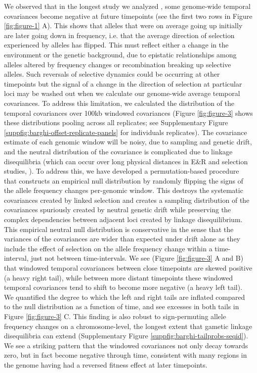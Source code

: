\documentclass[11pt]{article}
\begin{document}
We observed that in the longest study  we analyzed
\parencite{Barghi2019-qy}, some genome-wide temporal covariances become
negative at future timepoints (see the first two rows in Figure
\ref{fig:figure-1} A). This shows that alleles that were on average going up
initially are later going down in frequency, i.e. that the average direction of
selection experienced by alleles has flipped. This must reflect either a change
in the environment or the genetic background, due to epistatic relationships
among alleles altered by frequency changes or recombination breaking up
selective alleles.  Such reversals of selective dynamics could be occurring at
other timepoints but the signal of a change in the direction of selection at
particular loci may be washed out when we calculate our genome-wide average
temporal covariances. To address this limitation, we calculated the
distribution of the temporal covariances over 100kb windowed covariances
(Figure \ref{fig:figure-3} shows these distributions pooling across all
replicates; see Supplementary Figure
\ref{suppfig:barghi-offset-replicate-panels} for individuals replicates). The
covariance estimate of each genomic window will be noisy, due to sampling and
genetic drift, and the neutral distribution of the covariance is complicated
due to linkage disequilibria (which can occur over long physical distances in
E\&R and selection studies, \cite{Nuzhdin2013-gf,Baldwin-Brown2014-cl}). To
address this, we have developed a permutation-based procedure that constructs
an empirical null distribution by randomly flipping the signs of the allele
frequency changes per-genomic window. This destroys the systematic covariances
created by linked selection and creates a sampling distribution of the
covariances spuriously created by neutral genetic drift while preserving the
complex dependencies between adjacent loci created by linkage disequilibrium.
This empirical neutral null distribution is conservative in the sense that the
variances of the covariances are wider than expected under drift alone as they
include the effect of selection on the allele frequency change within a
time-interval, just not between time-intervals. We see (Figure
\ref{fig:figure-3} A and B) that windowed temporal covariances between close
timepoints are skewed positive (a heavy right tail), while between more distant
timepoints these windowed temporal covariances tend to shift to become more
negative (a heavy left tail).  We quantified the degree to which the left and
right tails are inflated compared to the null distribution as a function of
time, and see excesses in both tails in Figure \ref{fig:figure-3} C. This
finding is also robust to sign-permuting allele frequency changes on a
chromosome-level, the longest extent that gametic linkage disequilibria can
extend (Supplementary Figure \ref{suppfig:barghi-tailprobs-seqid}). We see a
striking pattern that the windowed covariances not only decay towards zero, but
in fact become negative through time, consistent with many regions in the
genome having had a reversed fitness effect at later timepoints.
\end{document}
